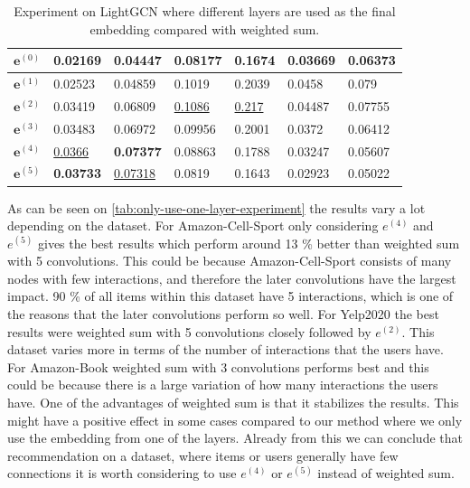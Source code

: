 \begin{table}[]
\begin{tabular}{|l|l|l|l|l|l|l|}
        $\mathbf{e}^{(0)}$   & 0.02169                                & 0.04447                       & 0.08177                          & 0.1674            & 0.03669             & 0.06373             \\ \hline
        $\mathbf{e}^{(1)}$   & 0.02523                                & 0.04859                       & 0.1019                           & 0.2039            & 0.0458              & 0.079               \\ \hline
        $\mathbf{e}^{(2)}$   & 0.03419                                & 0.06809                       & \underline{0.1086}               & \underline{0.217} & 0.04487             & 0.07755             \\ \hline
        $\mathbf{e}^{(3)}$   & 0.03483                                & 0.06972                       & 0.09956                          & 0.2001            & 0.0372              & 0.06412             \\ \hline
        $\mathbf{e}^{(4)}$   & \underline{0.0366}                     & \textbf{0.07377}              & 0.08863                          & 0.1788            & 0.03247             & 0.05607             \\ \hline
        $\mathbf{e}^{(5)}$   & \textbf{0.03733}                       & \underline{0.07318}           & 0.0819                           & 0.1643            & 0.02923             & 0.05022             \\ \hline
    \end{tabular}
    \centering
    \caption{Experiment on LightGCN where different layers are used as the final embedding compared with weighted sum.}
    \label{tab:only-use-one-layer-experiment}
\end{table}

As can be seen on \autoref{tab:only-use-one-layer-experiment} the results vary a lot depending on the dataset.
For Amazon-Cell-Sport only considering $e^{(4)}$ and $e^{(5)}$ gives the best results which perform around 13 \% better than weighted sum with 5 convolutions.
This could be because Amazon-Cell-Sport consists of many nodes with few interactions, and therefore the later convolutions have the largest impact. 90 \% of all items within this dataset have 5 interactions, which is one of the reasons that the later convolutions perform so well.
For Yelp2020 the best results were weighted sum with 5 convolutions closely followed by $e^{(2)}$.
This dataset varies more in terms of the number of interactions that the users have.
For Amazon-Book weighted sum with 3 convolutions performs best and this could be because there is a large variation of how many interactions the users have.
One of the advantages of weighted sum is that it stabilizes the results.
This might have a positive effect in some cases compared to our method where we only use the embedding from one of the layers.
Already from this we can conclude that recommendation on a dataset, where items or users generally have few connections it is worth considering to use $e^{(4)}$ or $e^{(5)}$ instead of weighted sum.